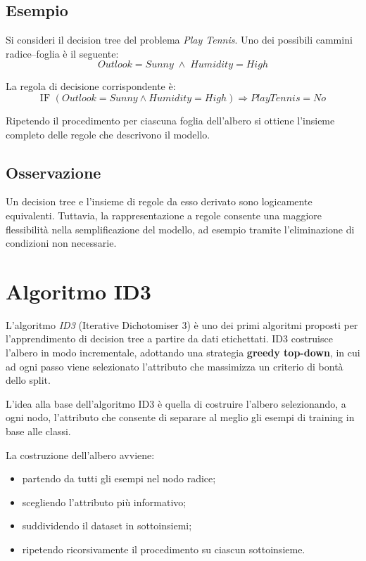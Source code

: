 \documentclass[a4paper,12pt]{report}
\begin{document}
\subsection*{Esempio}

Si consideri il decision tree del problema \textit{Play Tennis}.
Uno dei possibili cammini radice--foglia è il seguente:
\[
Outlook = Sunny \;\land\; Humidity = High
\]

La regola di decisione corrispondente è:
\[
\text{IF } (Outlook = Sunny \land Humidity = High) \Rightarrow PlayTennis = No
\]

Ripetendo il procedimento per ciascuna foglia dell’albero si ottiene l’insieme completo delle regole che descrivono il modello.

\subsection*{Osservazione}

Un decision tree e l’insieme di regole da esso derivato sono logicamente equivalenti.
Tuttavia, la rappresentazione a regole consente una maggiore flessibilità nella semplificazione del modello, ad esempio tramite l’eliminazione di condizioni non necessarie.

\section{Algoritmo ID3}

L’algoritmo \textit{ID3} (Iterative Dichotomiser 3) è uno dei primi algoritmi proposti per l’apprendimento di decision tree a partire da dati etichettati.
ID3 costruisce l’albero in modo incrementale, adottando una strategia \textbf{greedy top-down}, in cui ad ogni passo viene selezionato l’attributo che massimizza un criterio di bontà dello split.

L’idea alla base dell’algoritmo ID3 è quella di costruire l’albero selezionando, a ogni nodo, l’attributo che consente di separare al meglio gli esempi di training in base alle classi.

La costruzione dell’albero avviene:
\begin{itemize}
    \item partendo da tutti gli esempi nel nodo radice;
    \item scegliendo l’attributo più informativo;
    \item suddividendo il dataset in sottoinsiemi;
    \item ripetendo ricorsivamente il procedimento su ciascun sottoinsieme.
\end{itemize}
\end{document}
